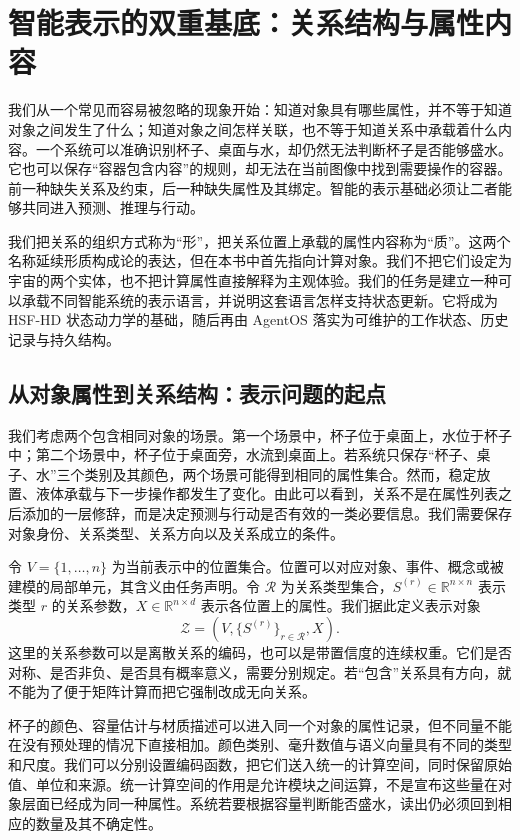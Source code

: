 \chapter{智能表示的双重基底：关系结构与属性内容}
\label{chp:dual_basis}

我们从一个常见而容易被忽略的现象开始：知道对象具有哪些属性，并不等于知道对象之间发生了什么；知道对象之间怎样关联，也不等于知道关系中承载着什么内容。一个系统可以准确识别杯子、桌面与水，却仍然无法判断杯子是否能够盛水。它也可以保存“容器包含内容”的规则，却无法在当前图像中找到需要操作的容器。前一种缺失关系及约束，后一种缺失属性及其绑定。智能的表示基础必须让二者能够共同进入预测、推理与行动。

我们把关系的组织方式称为“形”，把关系位置上承载的属性内容称为“质”。这两个名称延续形质构成论的表达，但在本书中首先指向计算对象。我们不把它们设定为宇宙的两个实体，也不把计算属性直接解释为主观体验。我们的任务是建立一种可以承载不同智能系统的表示语言，并说明这套语言怎样支持状态更新。它将成为 HSF-HD 状态动力学的基础，随后再由 AgentOS 落实为可维护的工作状态、历史记录与持久结构。

\section{从对象属性到关系结构：表示问题的起点}
\label{sec:physics_dilemma}

我们考虑两个包含相同对象的场景。第一个场景中，杯子位于桌面上，水位于杯子中；第二个场景中，杯子位于桌面旁，水流到桌面上。若系统只保存“杯子、桌子、水”三个类别及其颜色，两个场景可能得到相同的属性集合。然而，稳定放置、液体承载与下一步操作都发生了变化。由此可以看到，关系不是在属性列表之后添加的一层修辞，而是决定预测与行动是否有效的一类必要信息。我们需要保存对象身份、关系类型、关系方向以及关系成立的条件。

令 $V=\{1,\ldots,n\}$ 为当前表示中的位置集合。位置可以对应对象、事件、概念或被建模的局部单元，其含义由任务声明。令 $\mathcal{R}$ 为关系类型集合，$S^{(r)}\in\mathbb{R}^{n\times n}$ 表示类型 $r$ 的关系参数，$X\in\mathbb{R}^{n\times d}$ 表示各位置上的属性。我们据此定义表示对象
\begin{equation}
 \mathcal{Z}=\left(V,\{S^{(r)}\}_{r\in\mathcal{R}},X\right).
\end{equation}
这里的关系参数可以是离散关系的编码，也可以是带置信度的连续权重。它们是否对称、是否非负、是否具有概率意义，需要分别规定。若“包含”关系具有方向，就不能为了便于矩阵计算而把它强制改成无向关系。

杯子的颜色、容量估计与材质描述可以进入同一个对象的属性记录，但不同量不能在没有预处理的情况下直接相加。颜色类别、毫升数值与语义向量具有不同的类型和尺度。我们可以分别设置编码函数，把它们送入统一的计算空间，同时保留原始值、单位和来源。统一计算空间的作用是允许模块之间运算，不是宣布这些量在对象层面已经成为同一种属性。系统若要根据容量判断能否盛水，读出仍必须回到相应的数量及其不确定性。


